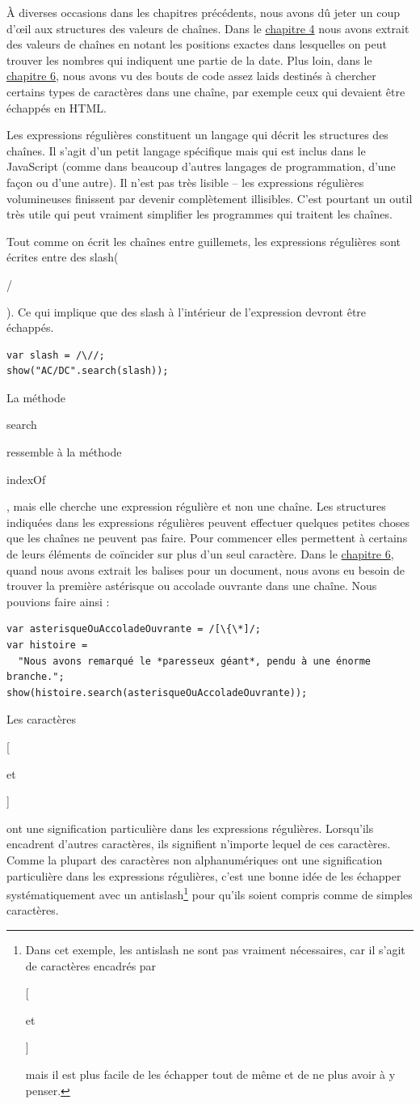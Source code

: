 \documentclass{FramateX}
\renewcommand{\texttt}[1]{\begin{sffamily}{#1}\end{sffamily}}
\begin{document}
À diverses occasions dans les chapitres précédents, nous avons dû jeter
un coup d'œil aux structures des valeurs de chaînes. Dans le
\href{chapter4.html}{chapitre 4} nous avons extrait des valeurs de
chaînes en notant les positions exactes dans lesquelles on peut trouver
les nombres qui indiquent une partie de la date. Plus loin, dans le
\href{chapter6.html}{chapitre 6}, nous avons vu des bouts de code assez
laids destinés à chercher certains types de caractères dans une chaîne,
par exemple ceux qui devaient être échappés en HTML.

Les expressions régulières constituent un langage qui décrit les
structures des chaînes. Il s'agit d'un petit langage spécifique mais qui
est inclus dans le JavaScript (comme dans beaucoup d'autres langages de
programmation, d'une façon ou d'une autre). Il n'est pas très lisible --
les expressions régulières volumineuses finissent par devenir
complètement illisibles. C'est pourtant un outil très utile qui peut
vraiment simplifier les programmes qui traitent les chaînes.

\begin{center}\end{center}

Tout comme on écrit les chaînes entre guillemets, les expressions
régulières sont écrites entre des slash(\texttt{/}). Ce qui implique que
des slash à l'intérieur de l'expression devront être échappés.

\begin{lstlisting}
var slash = /\//;
show("AC/DC".search(slash));
\end{lstlisting}
La méthode \texttt{search} ressemble à la méthode \texttt{indexOf}, mais
elle cherche une expression régulière et non une chaîne. Les structures
indiquées dans les expressions régulières peuvent effectuer quelques
petites choses que les chaînes ne peuvent pas faire. Pour commencer
elles permettent à certains de leurs éléments de coïncider sur plus d'un
seul caractère. Dans le \href{chapter6.html}{chapitre 6}, quand nous
avons extrait les balises pour un document, nous avons eu besoin de
trouver la première astérisque ou accolade ouvrante dans une chaîne.
Nous pouvions faire ainsi :

\begin{lstlisting}
var asterisqueOuAccoladeOuvrante = /[\{\*]/;
var histoire =
  "Nous avons remarqué le *paresseux géant*, pendu à une énorme branche.";
show(histoire.search(asterisqueOuAccoladeOuvrante));
\end{lstlisting}
Les caractères \texttt{{[}} et \texttt{{]}} ont une signification
particulière dans les expressions régulières. Lorsqu'ils encadrent
d'autres caractères, ils signifient n'importe lequel de ces caractères.
Comme la plupart des caractères non alphanumériques ont une
signification particulière dans les expressions régulières, c'est une
bonne idée de les échapper systématiquement avec un
antislash\footnote{Dans cet exemple, les antislash ne sont pas vraiment nécessaires, car il s'agit de caractères encadrés par \texttt{{[}} et \texttt{{]}} mais il est plus facile de les échapper tout de même et de ne plus avoir à y penser.} pour qu'ils soient compris comme de
simples caractères.
\end{document}
